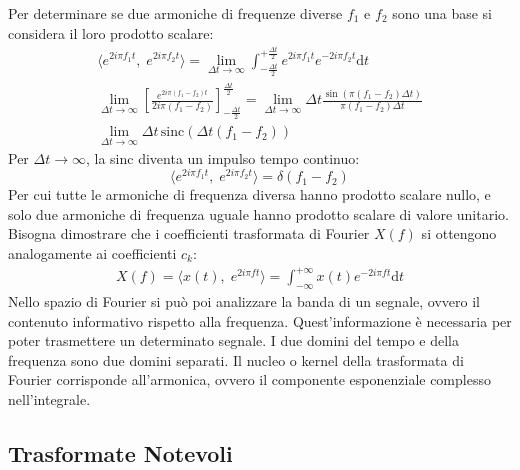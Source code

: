 \documentclass{article}
\newcommand{\sinc}{\mathrm{sinc}}
\newcommand{\df}{\mathrm{d}}
\numberwithin{equation}{subsection}
\begin{document}
Per determinare se due armoniche di frequenze diverse $f_1$ e $f_2$ sono una base si considera il loro prodotto scalare:
\begin{gather*}
    \langle e^{2i\pi f_1t},\;e^{2i\pi f_2t}\rangle=\displaystyle\lim_{\Delta t\to\infty}\int_{-\frac{\Delta t}{2}}^{+\frac{\Delta t}{2}}e^{2i\pi f_1t}e^{-2i\pi f_2t}\df t\\
    \displaystyle\lim_{\Delta t\to\infty}\left[\frac{e^{2i\pi(f_1-f_2)t}}{2i\pi(f_1-f_2)}\right]^{\frac{\Delta t}{2}}_{-\frac{\Delta t}{2}}=\lim_{\Delta t\to\infty}
    \Delta t\frac{\sin(\pi(f_1-f_2)\Delta t)}{\pi(f_1-f_2)\Delta t}\\
    \displaystyle\lim_{\Delta t\to\infty}\Delta t\,\sinc(\Delta t(f_1-f_2))
\end{gather*}
Per $\Delta t\to\infty$, la sinc diventa un impulso tempo continuo:
\begin{equation*}
    \langle e^{2i\pi f_1t},\;e^{2i\pi f_2t}\rangle=\delta(f_1-f_2)
\end{equation*}
Per cui tutte le armoniche di frequenza diversa hanno prodotto scalare nullo, e solo due armoniche di frequenza uguale hanno prodotto scalare di valore unitario. 
Bisogna dimostrare che i coefficienti trasformata di Fourier $X(f)$ si ottengono analogamente ai coefficienti $c_k$:
\begin{gather*}
    X(f)=\langle x(t),\;e^{2i\pi ft}\rangle=\displaystyle\int_{-\infty}^{+\infty}x(t)e^{-2i\pi ft}\df t
\end{gather*}
Nello spazio di Fourier si può poi analizzare la banda di un segnale, ovvero il contenuto informativo rispetto alla frequenza. Quest'informazione è necessaria per poter 
trasmettere un determinato segnale. I due domini del tempo e della frequenza sono due domini separati. 
Il nucleo o kernel della trasformata di Fourier corrisponde all'armonica, ovvero il componente esponenziale complesso nell'integrale. 

\subsection{Trasformate Notevoli}
\end{document}
